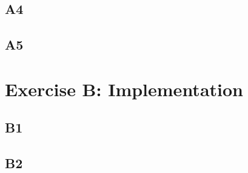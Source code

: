 \documentclass[11pt]{article}
\begin{document}
\subsection*{A4}

\subsection*{A5}

\section*{Exercise B: Implementation}
\subsection*{B1}
\subsection*{B2}
\end{document}
